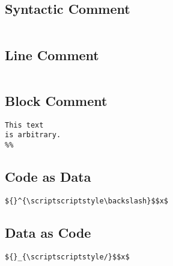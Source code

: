 \documentclass{article}
\begin{document}
\begin{multicols}
\subsection*{Syntactic Comment}
\begin{lstlisting}[mathescape]
%$x$
\end{lstlisting}

\subsection*{Line Comment}
\begin{lstlisting}[mathescape]
% This text is arbitrary.
\end{lstlisting}

\subsection*{Block Comment}
\begin{lstlisting}[mathescape]
%%
This text
is arbitrary.
%%
\end{lstlisting}

\subsection*{Code as Data}
\begin{lstlisting}[mathescape]
${}^{\scriptscriptstyle\backslash}$$x$
\end{lstlisting}

\subsection*{Data as Code}
\begin{lstlisting}[mathescape]
${}_{\scriptscriptstyle/}$$x$
\end{lstlisting}

\end{multicols}
\end{document}

